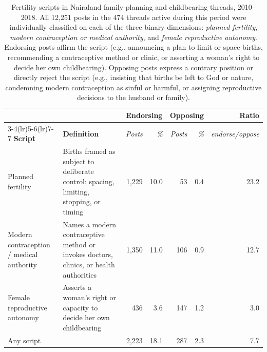 \begin{table}[t]
\centering
\footnotesize
\begin{tabular}{p{2.9cm}p{5.6cm}rrrrr}
\toprule
 & & \multicolumn{2}{c}{\textbf{Endorsing}} & \multicolumn{2}{c}{\textbf{Opposing}} & \textbf{Ratio} \\
\cmidrule(lr){3-4}\cmidrule(lr){5-6}\cmidrule(lr){7-7}
\textbf{Script} & \textbf{Definition} & \textit{Posts} & \textit{\%} & \textit{Posts} & \textit{\%} & \textit{endorse/oppose} \\
\midrule
Planned fertility & Births framed as subject to deliberate control: spacing, limiting, stopping, or timing & 1,229 & 10.0 & 53 & 0.4 & 23.2 \\
\addlinespace
Modern contraception / medical authority & Names a modern contraceptive method or invokes doctors, clinics, or health authorities & 1,350 & 11.0 & 106 & 0.9 & 12.7 \\
\addlinespace
Female reproductive autonomy & Asserts a woman's right or capacity to decide her own childbearing & 436 & 3.6 & 147 & 1.2 & 3.0 \\
\midrule
Any script & & 2,223 & 18.1 & 287 & 2.3 & 7.7 \\
\bottomrule
\end{tabular}
\caption{Fertility scripts in Nairaland family-planning and childbearing threads, 2010--2018. All 12,251 posts in the 474 threads active during this period were individually classified on each of the three binary dimensions: \textit{planned fertility}, \textit{modern contraception or medical authority}, and \textit{female reproductive autonomy}. Endorsing posts affirm the script (e.g., announcing a plan to limit or space births, recommending a contraceptive method or clinic, or asserting a woman's right to decide her own childbearing). Opposing posts express a contrary position or directly reject the script (e.g., insisting that births be left to God or nature, condemning modern contraception as sinful or harmful, or assigning reproductive decisions to the husband or family).}
\label{tab:nairaland_scripts}
\end{table}
